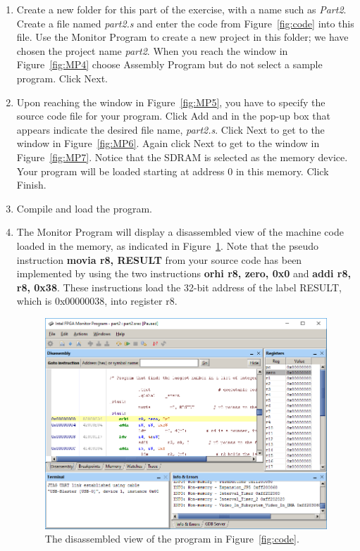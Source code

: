 \documentclass[epsfig,10pt,fullpage]{article}
\begin{document}
\begin{enumerate}
\item Create a new folder for this part of the exercise, with a name such as {\it Part2}.  
Create a file named {\it part2.s} and enter the code from Figure~\ref{fig:code} into this
file.  Use the Monitor Program to create a new project in this folder; we have chosen the 
project name {\it part2}.  When you reach the window in Figure~\ref{fig:MP4} 
choose {\sf Assembly Program} but do not select a sample program. Click {\sf Next}.
\item Upon reaching the window in Figure~\ref{fig:MP5}, you have to specify the source
		  code file for your program.
Click {\sf Add} and in the pop-up box that appears indicate the desired file name,
{\it part2.s}.  Click {\sf Next} to get to the window in Figure~\ref{fig:MP6}. 
Again click {\sf Next} to get to the window in Figure~\ref{fig:MP7}. Notice that the 
SDRAM is selected as the memory device.  Your program will be loaded starting at
address 0 in this memory.  Click {\sf Finish}.
\item Compile and load the program.

\item The Monitor Program will display a disassembled view of the machine code loaded
		  in the memory, as indicated in Figure~\ref{fig:MP11}. 
Note that the pseudo instruction {\bf movia r8, RESULT} from your source code
has been implemented by using the two instructions {\bf orhi r8, zero, 0x0} and 
{\bf addi r8, r8, 0x38}.  These instructions load the 32-bit address of the label RESULT,
which is {\sf 0x00000038}, into register r8.

\begin{figure}[H]
	\begin{center}
	\includegraphics[scale=0.58]{figures/figureMP11.png}
	\end{center}
	\caption{The disassembled view of the program in Figure~\ref{fig:code}.}
\label{fig:MP11}
\end{figure}


\end{enumerate}
\end{document}
